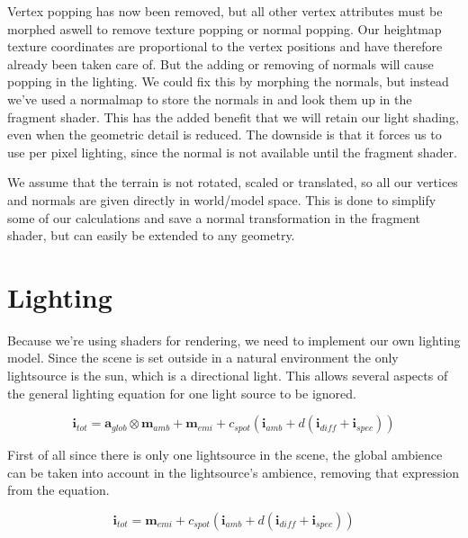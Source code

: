 

Vertex popping has now been removed, but all other vertex attributes
must be morphed aswell to remove texture popping or normal
popping. Our heightmap texture coordinates are proportional to the
vertex positions and have therefore already been taken care of. But
the adding or removing of normals will cause popping in the
lighting. We could fix this by morphing the normals, but instead we've
used a normalmap to store the normals in and look them up in the
fragment shader. This has the added benefit that we will retain our
light shading, even when the geometric detail is reduced. The downside
is that it forces us to use per pixel lighting, since the normal is
not available until the fragment shader.

We assume that the terrain is not rotated, scaled or translated, so
all our vertices and normals are given directly in world/model
space. This is done to simplify some of our calculations and save a
normal transformation in the fragment shader, but can easily be
extended to any geometry.

\section{Lighting}


Because we're using shaders for rendering, we need to implement our
own lighting model. Since the scene is set outside in a natural
environment the only lightsource is the sun, which is a directional
light. This allows several aspects of the general lighting equation
for one light source to be ignored.


\begin{displaymath}
  \mathbf{i}_{tot} = \mathbf{a}_{glob} \otimes \mathbf{m}_{amb} +
  \mathbf{m}_{emi} + c_{spot}(\mathbf{i}_{amb} + d(\mathbf{i}_{diff} + \mathbf{i}_{spec}))
\end{displaymath}

First of all since there is only one lightsource in the scene, the
global ambience can be taken into account in the lightsource's
ambience, removing that expression from the equation.

\begin{displaymath}
  \mathbf{i}_{tot} = \mathbf{m}_{emi} + c_{spot}(\mathbf{i}_{amb} + d(\mathbf{i}_{diff} + \mathbf{i}_{spec}))
\end{displaymath}

